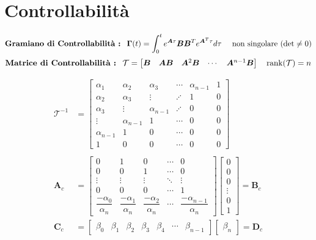 \documentclass[a4paper]{article}
\renewcommand{\vec}{\bm}
\begin{document}
	\section*{Controllabilità}
	\[
		\text{\textbf{Gramiano di Controllabilità :} }\ \vec{\Gamma}(t) = \int_{0}^{t} e^{\vec{A}\tau} \vec{B}\vec{B}^T e^{\vec{A}^T\tau}d\tau\quad
		\text{ non singolare } (\det \neq 0)
	\]
	\[
		\text{\textbf{Matrice di Controllabilità :} }\
		\mathcal{T} = 
		\begin{bmatrix}
		\vec{B} & \vec{A}\vec{B} & \vec{A}^2\vec{B} & \cdots & \vec{A}^{n-1}\vec{B}
		\end{bmatrix}\quad
		\rank (\mathcal{T}) = n
	\]
	\begin{multicols}{2}
		\begin{align*}
			\mathcal{T}^{-1} &= 
			\begin{bmatrix}
				\alpha_1 & \alpha_2 & \alpha_3 & \cdots & \alpha_{n-1} & 1 \\
				\alpha_2 & \alpha_3 & \vdots & \iddots & 1 & 0 \\
				\alpha_3 & \vdots & \alpha_{n-1} & \iddots & 0 & 0 \\
				\vdots & \alpha_{n-1} & 1 & \cdots & 0 & 0 \\
				\alpha_{n-1} & 1 & 0 & \cdots & 0 & 0 \\
				1 & 0 & 0 & \cdots & 0 & 0
			\end{bmatrix} \\ \\
			\vec{A}_c &=
			\begin{bmatrix}
				0 & 1 & 0 & \cdots & 0 \\
				0 & 0 & 1 & \cdots & 0 \\
				\vdots & \vdots & \vdots & \ddots & \vdots \\
				0 & 0 & 0 & \cdots & 1 \\
				\dfrac{-\alpha_0}{\alpha_n} & \dfrac{-\alpha_1}{\alpha_n} & \dfrac{-\alpha_2}{\alpha_n} & \cdots & \dfrac{-\alpha_{n-1}}{\alpha_n}
			\end{bmatrix}
			\begin{bmatrix}
				0 \\
				0 \\
				0 \\
				\vdots\\
				0 \\
				1
			\end{bmatrix}
			= \vec{B}_c \\
			\vec{C}_c &=
			\begin{bmatrix}
				\beta_0 & \beta_1 & \beta_2 & \beta_3 & \beta_4 & \cdots & \beta_{n-1} 
			\end{bmatrix}
			\begin{bmatrix}
				\beta_n
			\end{bmatrix}
			= \vec{D}_c
		\end{align*}
		\columnbreak
		

\end{multicols}
\end{document}
